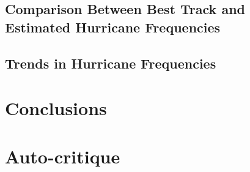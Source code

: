 \documentclass[pdftex,12pt,a4paper]{report}
\begin{document}
\section{Comparison Between Best Track and Estimated Hurricane Frequencies}

\section{Trends in Hurricane Frequencies}

\chapter{Conclusions}
\label{chap:conclusion}

\chapter*{Auto-critique}

\printbibliography[title={References}]

\end{document}
